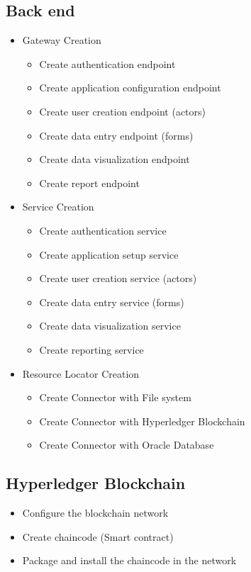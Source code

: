 \subsection{Back end}\label{sec:BackendActivities}
\begin{itemize}
\item Gateway Creation
    \begin{itemize}
    \item Create authentication endpoint
    \item Create application configuration endpoint
    \item Create user creation endpoint (actors)
    \item Create data entry endpoint (forms)
    \item Create data visualization endpoint
    \item Create report endpoint
    \end{itemize}
\item Service Creation
    \begin{itemize}
    \item Create authentication service
    \item Create application setup service
    \item Create user creation service (actors)
    \item Create data entry service (forms)
    \item Create data visualization service
    \item Create reporting service
    \end{itemize}
\item Resource Locator Creation
    \begin{itemize}
    \item Create Connector with File system
    \item Create Connector with Hyperledger Blockchain
    \item Create Connector with Oracle Database
    \end{itemize}
\end{itemize}

\subsection{Hyperledger Blockchain}\label{sec:HyperledgerBlockchain}
\begin{itemize}
\item Configure the blockchain network
\item Create chaincode (Smart contract)
\item Package and install the chaincode in the network
\end{itemize}
